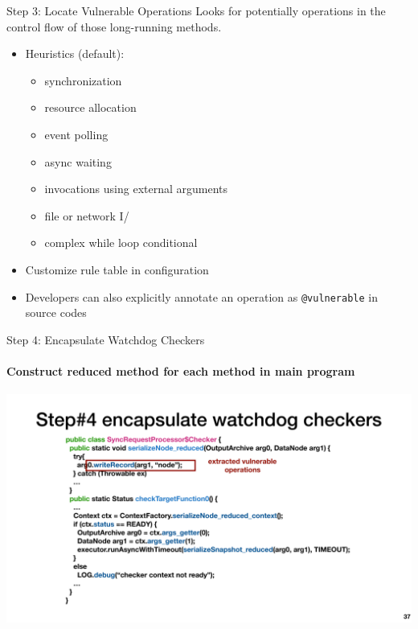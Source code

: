 \documentclass[aspectratio=169]{beamer}
\newcommand{\red}[1]{{\color{red}{#1}}}
\begin{document}
\begin{frame}{Step 3: Locate Vulnerable Operations}
    Looks for potentially \red{vulnerable} operations in the control flow of those long-running methods.

    \begin{itemize}
        \item Heuristics (default):
              \begin{itemize}
                  \item synchronization
                  \item resource allocation
                  \item event polling
                  \item async waiting
                  \item invocations using external arguments
                  \item file or network I/
                  \item complex while loop conditional
              \end{itemize}
        \item Customize rule table in configuration
        \item Developers can also explicitly annotate an operation as \texttt{@vulnerable} in source codes
    \end{itemize}
\end{frame}

\begin{frame}{Step 4: Encapsulate Watchdog Checkers}
    \framesubtitle{Construct reduced method for each \red{vulnerable} method in main program}
    \begin{center}
        \includegraphics[width=.85\textwidth]{fig/encapsulate}
    \end{center}
\end{frame}
\end{document}
